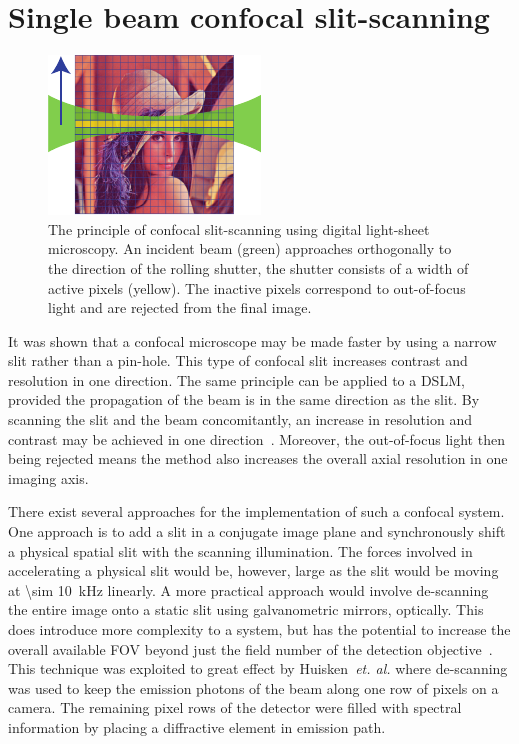 \pagebreak

\section{Single beam confocal \gls{slit-scanning}}

\begin{figure}
  \centering
  \includegraphics[width=0.4\linewidth]{slit_scanning_alt}
  \caption[The principle of confocal \gls{slit-scanning} using digital light-sheet microscopy]{The principle of confocal \gls{slit-scanning} using digital light-sheet microscopy.
  An incident beam (green) approaches orthogonally to the direction of the rolling shutter, the shutter consists of a width of active pixels (yellow).
  The inactive pixels correspond to out-of-focus light and are rejected from the final image.}
  \label{fig:slit_scanning_alt}
\end{figure}

It was shown that a confocal microscope may be made faster by using a narrow slit rather than a pin-hole.
This type of confocal slit increases contrast and resolution in one direction\cite{sabharwalSlitscanningConfocalMicroendoscope1999}.
The same principle can be applied to a \gls{DSLM}, provided the propagation of the beam is in the same direction as the slit.
By scanning the slit and the beam concomitantly, an increase in resolution and contrast may be achieved in one direction~\cite{baumgartScannedLightSheet2012}.
Moreover, the out-of-focus light then being rejected means the method also increases the overall axial resolution in one imaging axis.

There exist several approaches for the implementation of such a confocal system.
One approach is to add a slit in a conjugate image plane and synchronously shift a physical spatial slit with the scanning illumination.
The forces involved in accelerating a physical slit would be, however, large as the slit would be moving at \SI{\sim 10}{\kilo\hertz} linearly.
A more practical approach would involve de-scanning the entire image onto a static slit using galvanometric mirrors, optically.
This does introduce more complexity to a system, but has the potential to increase the overall available \gls{FOV} beyond just the field number of the detection objective~\cite{jahrHyperspectralLightSheet2015}.
This technique was exploited to great effect by Huisken~\emph{et. al.} where de-scanning was used to keep the emission photons of the beam along one row of pixels on a camera.
The remaining pixel rows of the detector were filled with spectral information by placing a diffractive element in emission path.

